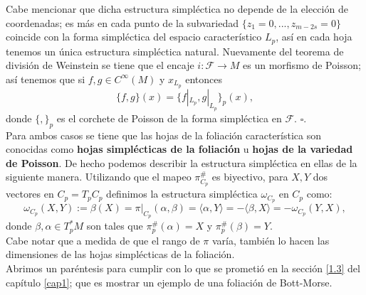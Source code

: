 \documentclass[a4paper,10pt]{book}
\begin{document}
Cabe mencionar que dicha estructura simpl\'ectica no depende de la elecci\'on de coordenadas; es m\'as en cada punto de la subvariedad $\{z_{1}=0,...,z_{m-2s}=0\}$ coincide con la forma simpl\'ectica del espacio caracter\'istico $L_{p}$, as\'i en cada hoja tenemos un \'unica estructura simpl\'ectica natural. Nuevamente del teorema de divisi\'on de Weinstein se tiene que el encaje $i:\mathcal{F}\to M$ es un morfismo de Poisson; as\'i tenemos que si $f,g\in C^{\infty}(M)$ y $x_{L_{p}}$ entonces 
$$\{f,g\}(x)=\{f|_{L_{p}},g|_{L_{p}}\}_{p}(x),$$
donde $\{,\}_{p}$ es el corchete de Poisson de la forma simpl\'ectica en $\mathcal{F}$.  \hfill $\square$.\\

Para ambos casos se tiene que las hojas de la foliaci\'on caracter\'istica son conocidas como {\bfseries hojas simpl\'ecticas de la foliaci\'on} u {\bfseries hojas de la variedad de Poisson}. De hecho podemos describir la estructura simpl\'ectica en ellas de la siguiente manera. Utilizando que el mapeo $\pi^{\#}_{C_{p}}$ es biyectivo, para $X,Y$ dos vectores en $C_{p}=T_{p}C_{p}$ definimos la estructura simpl\'ectica $\omega_{C_{p}}$ en $C_{p}$ como:
\begin{equation}\label{EcForSimp}
\omega_{C_{p}}(X,Y):=\beta(X) = \pi|_{C_{p}}(\alpha, \beta) = \langle\alpha, Y\rangle =-\langle\beta, X\rangle = -\omega_{C_{p}}(Y,X),
\end{equation}
donde $\beta,\alpha\in T^{*}_{p}M$ son tales que $\pi^{\#}_{p}(\alpha)=X$ y $\pi^{\#}_{p}(\beta)=Y$.\\

Cabe notar que a medida de que el rango de $\pi$ var\'ia, tambi\'en lo hacen las dimensiones de las hojas simpl\'ecticas de la foliaci\'on.\\

Abrimos un par\'entesis para cumplir con lo que se prometi\'o en la secci\'on \ref{1.3} del cap\'itulo \ref{cap1}; que es mostrar un ejemplo de una foliaci\'on de Bott-Morse.
\end{document}
